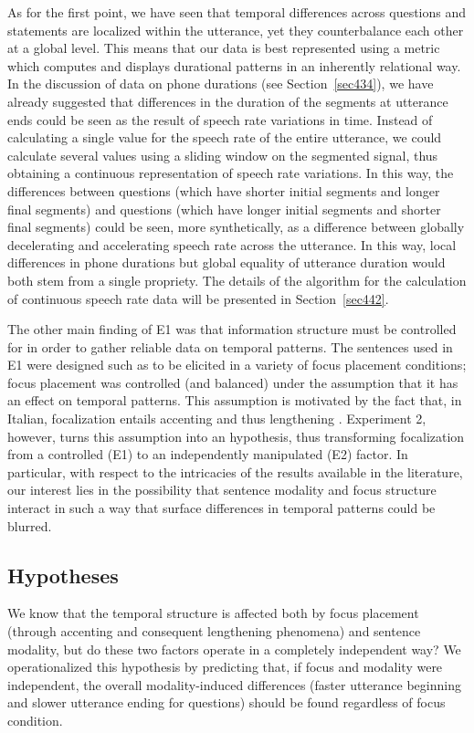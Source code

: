 As for the first point, we have seen that temporal differences across questions and statements are localized within the utterance, yet they counterbalance each other at a global level. This means that our data is best represented using a metric which computes and displays durational patterns in an inherently relational way. In the discussion of data on phone durations (see Section~\ref{sec434}), we have already suggested that differences in the duration of the segments at utterance ends could be seen as the result of speech rate variations in time. Instead of calculating a single value for the speech rate of the entire utterance, we could calculate several values using a sliding window on the segmented signal, thus obtaining a continuous representation of speech rate variations. In this way, the differences between questions (which have shorter initial segments and longer final segments) and questions (which have longer initial segments and shorter final segments) could be seen, more synthetically, as a difference between globally decelerating and accelerating speech rate across the utterance. In this way, local differences in phone durations but global equality of utterance duration would both stem from a single propriety. The details of the algorithm for the calculation of continuous speech rate data will be presented in Section~\ref{sec442}.

The other main finding of E1 was that information structure must be controlled for in order to gather reliable data on temporal patterns. The sentences used in E1 were designed such as to be elicited in a variety of focus placement conditions; focus placement was controlled (and balanced) under the assumption that it has an effect on temporal patterns. This assumption is motivated by the fact that, in Italian, focalization entails accenting and thus lengthening \citep{farnetani1990rhytmic}. Experiment 2, however, turns this assumption into an hypothesis, thus transforming focalization from a controlled (E1) to an independently manipulated (E2) factor. In particular, with respect to the intricacies of the results available in the literature, our interest lies in the possibility that sentence modality and focus structure interact in such a way that surface differences in temporal patterns could be blurred.

\subsection{Hypotheses}\label{sec441}
We know that the temporal structure is affected both by focus placement (through accenting and consequent lengthening phenomena) and sentence modality, but do these two factors operate in a completely independent way? We operationalized this hypothesis by predicting that, if focus and modality were independent, the overall modality-induced differences (faster utterance beginning and slower utterance ending for questions) should be found regardless of focus condition. 

